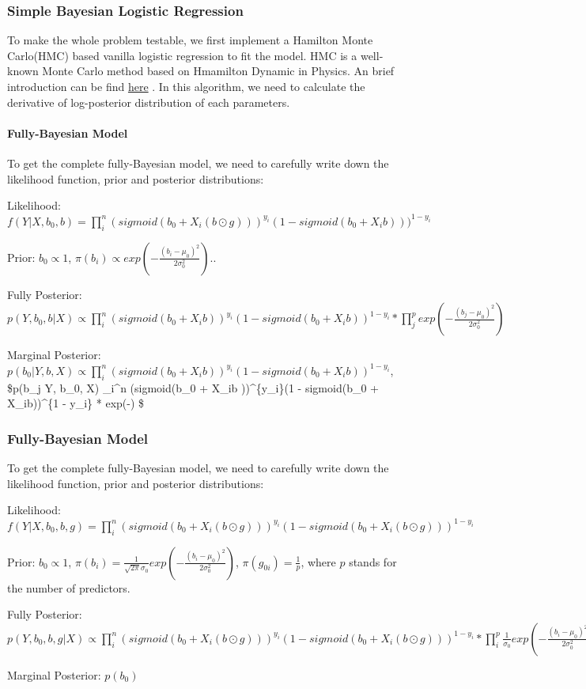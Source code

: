 \documentclass[
]{article}
\begin{document}
\hypertarget{simple-bayesian-logistic-regression}{%
\subsubsection{Simple Bayesian Logistic
Regression}\label{simple-bayesian-logistic-regression}}

To make the whole problem testable, we first implement a Hamilton Monte
Carlo(HMC) based vanilla logistic regression to fit the model. HMC is a
well-known Monte Carlo method based on Hmamilton Dynamic in Physics. An
brief introduction can be find
\href{https://en.wikipedia.org/wiki/Hamiltonian_Monte_Carlo}{here} . In
this algorithm, we need to calculate the derivative of log-posterior
distribution of each parameters.

\hypertarget{fully-bayesian-model}{%
\paragraph{Fully-Bayesian Model}\label{fully-bayesian-model}}

To get the complete fully-Bayesian model, we need to carefully write
down the likelihood function, prior and posterior distributions:

Likelihood:
\(f(Y|X,b_0, b) = \prod_i^n (sigmoid(b_0 + X_i(b \odot g)))^{y_i}(1 - sigmoid(b_0 + X_ib)))^{1 - y_i}\)

Prior: \(b_0 \varpropto 1\),
\(\pi(b_i) \varpropto exp(-\frac{(b_i - \mu_0)^2}{2\sigma_0^2})\)..

Fully Posterior:
\(p(Y, b_0, b | X) \varpropto \prod_i^n (sigmoid(b_0 + X_ib ))^{y_i}(1 - sigmoid(b_0 + X_ib))^{1 - y_i} * \prod_j^p exp(-\frac{(b_j - \mu_0)^2}{2\sigma_0^2})\)

Marginal Posterior:
\(p(b_0 | Y, b, X) \varpropto \prod_i^n (sigmoid(b_0 + X_ib ))^{y_i}(1 - sigmoid(b_0 + X_ib))^{1 - y_i}\),
\$p(b\_j \textbar{} Y, b\_0, X) \varpropto \prod\_i\^{}n (sigmoid(b\_0 +
X\_ib ))\^{}\{y\_i\}(1 - sigmoid(b\_0 + X\_ib))\^{}\{1 - y\_i\} *
exp(-) \$

\hypertarget{fully-bayesian-model-1}{%
\subsubsection{Fully-Bayesian Model}\label{fully-bayesian-model-1}}

To get the complete fully-Bayesian model, we need to carefully write
down the likelihood function, prior and posterior distributions:

Likelihood:
\(f(Y|X,b_0, b, g) = \prod_i^n (sigmoid(b_0 + X_i(b \odot g)))^{y_i}(1 - sigmoid(b_0 + X_i(b \odot g)))^{1 - y_i}\)

Prior: \(b_0 \varpropto 1\),
\(\pi(b_i) = \frac{1}{\sqrt{2\pi}\sigma_0}exp(-\frac{(b_i - \mu_0)^2}{2\sigma_0^2})\),
\(\pi(g_{0i}) = \frac{1}{p}\), where \(p\) stands for the number of
predictors.

Fully Posterior:
\(p(Y, b_0, b, g | X) \varpropto \prod_i^n (sigmoid(b_0 + X_i(b \odot g)))^{y_i}(1 - sigmoid(b_0 + X_i(b \odot g)))^{1 - y_i} * \prod_i^p \frac{1}{\sigma_0}exp(-\frac{(b_i - \mu_0)^2}{2\sigma_0^2})\)

Marginal Posterior: \(p(b_0)\)
\end{document}
